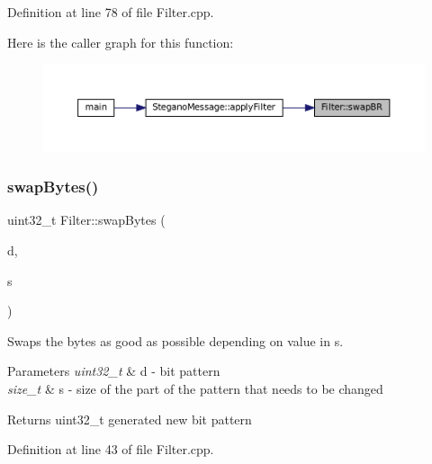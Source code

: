 Definition at line 78 of file Filter.\+cpp.

Here is the caller graph for this function\+:
\nopagebreak
\begin{figure}[H]
\begin{center}
\leavevmode
\includegraphics[width=350pt]{classFilter_a51a2b1cce4671083d47530694d0e797e_icgraph}
\end{center}
\end{figure}
\mbox{\label{classFilter_a9d4f7bd12f0bfdf200abf53d166fd944}} 
\subsubsection{\texorpdfstring{swapBytes()}{swapBytes()}}
{\footnotesize\ttfamily uint32\+\_\+t Filter\+::swap\+Bytes (\begin{DoxyParamCaption}\item[{uint32\+\_\+t}]{d,  }\item[{size\+\_\+t}]{s }\end{DoxyParamCaption})\hspace{0.3cm}{\ttfamily [static]}}



Swaps the bytes as good as possible depending on value in s. 


\begin{DoxyParams}{Parameters}
{\em uint32\+\_\+t} & d -\/ bit pattern \\
\hline
{\em size\+\_\+t} & s -\/ size of the part of the pattern that needs to be changed \\
\hline
\end{DoxyParams}
\begin{DoxyReturn}{Returns}
uint32\+\_\+t generated new bit pattern 
\end{DoxyReturn}


Definition at line 43 of file Filter.\+cpp.

